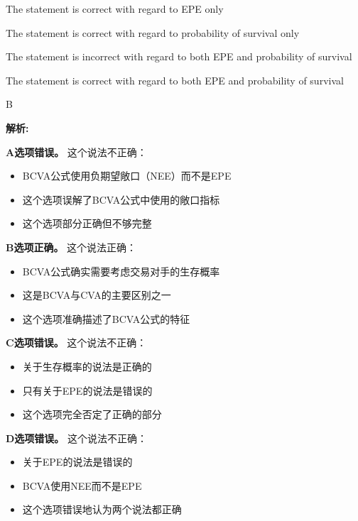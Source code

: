 \documentclass{article}
\newenvironment{explanation}
{\textbf{解析:}\par}
{\par}
\begin{document}
\begin{choices}
    \item The statement is correct with regard to EPE only
    \item The statement is correct with regard to probability of survival only
    \item The statement is incorrect with regard to both EPE and probability of survival
    \item The statement is correct with regard to both EPE and probability of survival
\end{choices}

\begin{correctanswer}
    B
\end{correctanswer}

\begin{explanation}
    \textbf{A选项错误。}
    这个说法不正确：
    \begin{itemize}
        \item BCVA公式使用负期望敞口（NEE）而不是EPE
        \item 这个选项误解了BCVA公式中使用的敞口指标
        \item 这个选项部分正确但不够完整
    \end{itemize}

    \textbf{B选项正确。}
    这个说法正确：
    \begin{itemize}
        \item BCVA公式确实需要考虑交易对手的生存概率
        \item 这是BCVA与CVA的主要区别之一
        \item 这个选项准确描述了BCVA公式的特征
    \end{itemize}

    \textbf{C选项错误。}
    这个说法不正确：
    \begin{itemize}
        \item 关于生存概率的说法是正确的
        \item 只有关于EPE的说法是错误的
        \item 这个选项完全否定了正确的部分
    \end{itemize}

    \textbf{D选项错误。}
    这个说法不正确：
    \begin{itemize}
        \item 关于EPE的说法是错误的
        \item BCVA使用NEE而不是EPE
        \item 这个选项错误地认为两个说法都正确
    \end{itemize}
\end{explanation}
\end{document}
